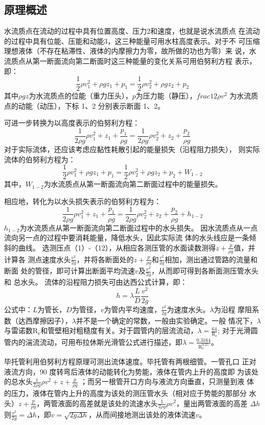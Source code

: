\documentclass[dvipsnames, svgnames,a4paper,11pt]{article}
\begin{document}
\subsection{原理概述}
水流质点在流动的过程中具有位置高度、压力2和速度，也就是说水流质点
在流动的过程中具有位能、压能和动能3，这三种能量可用水柱高度表示。对于不
可压缩理想液体（不存在粘滞性、液体的内摩擦力为零，故所做的功也为零）来
说，水流质点从第一断面流向第二断面时这三种能量的变化关系可用伯努利方程
表示，即：
$$\frac{1}{2}\rho v_1^2+\rho gz_1+p_1=\frac{1}{2}\rho v_2^2+\rho gz_2+p_2$$
其中$\rho gz$为水流质点的位能（重力压头），$p$为压力能（静压），$frac{1}{2}\rho v^2$
为水流质点的动能（动压），下标 1、2 分别表示断面 1、2。

可进一步转换为以高度表示的伯努利方程：
$$\frac{1}{2\rho g}\rho v_1^2+z_1+\frac{p_1}{\rho g}=\frac{1}{2\rho g}\rho v_2^2+z_2+\frac{p_2}{\rho g}$$
对于实际流体，还应该考虑应黏性耗散引起的能量损失（沿程阻力损失），
则实际流体的伯努利方程为：
$$\frac{1}{2}\rho v_1^2+\rho gz_1+p_1=\frac{1}{2}\rho v_2^2+\rho gz_2+p_2+W_{1-2}$$
其中，$W_{1-2}$为水流质点从第一断面流向第二断面过程中的能量损失。

相应地，转化为以水头损失表示的伯努利方程为：
$$\frac{1}{2\rho g}\rho v_1^2+z_1+\frac{p_1}{\rho g}=\frac{1}{2\rho g}\rho v_2^2+z_2+\frac{p_2}{\rho g}+h_{1-2}$$
$h_{1-2}$为水流质点从第一断面流向第二断面过程中的水头损失。
因水流质点从一点流向另一点的过程中要消耗能量，降低水头，因此实际流
体的水头线应是一条倾斜的曲线。
选测压点（1）-（12），从相应各测压管的水面读数测得$z+\frac{p}{\rho g}$值，并计算各
测点速度水头$\frac{ v^2}{2g}$，并将各断面处的$z+\frac{p}{\rho g}$和$\frac{ v^2}{2g}$相加，测出通过管路的流量和断面
处的管径，即可计算出断面平均流速$v$及$\frac{v^2}{2g}$，从而即可得到各断面测压管水头和
总水头。
流体的沿程阻力损失可由达西公式计算，即：
$$h=\lambda\frac{L}{D}\frac{v^2}{2g}$$
公式中：$L$为管长，$D$为管径，$v$为管内平均速度，$\frac{v^2}{2g}$为速度水头。$\lambda$为沿程
摩阻系数（达西摩擦因子），$\lambda$并不是一个确定的常数，一般由实验确定。一般
情况下，$\lambda$与雷诺数$\text{R}_\text{e}$和管壁相对粗糙度有关。对于圆管内的层流流动，$\lambda=\frac{64}{\text{R}_\text{e}}$;
对于光滑圆管内的湍流流动，可用布拉休斯光滑管公式进行描述，即$\lambda=\frac{0.3164}{\text{R}_\text{e}^{0.25}}$。

毕托管利用伯努利方程原理可测出流体速度。毕托管有两根细管。一管孔口
正对液流方向，90 度转弯后液体的动能转化为势能，液体在管内上升的高度即
为该处的总水头$\frac{1}{2\rho g}\rho v^2+z+\frac{p}{\rho g}$
；而另一根管开口方向与液流方向垂直，只测量到液
体的压力，液体在管内上升的高度为该处的测压管水头（相对应于势能的那部分
水头）$z+\frac{p}{\rho g}$，两管液面的高差就是该处的流速水头$\frac{1}{2\rho g}\rho v^2$，量出两管液面的高差
$\Delta h$则$\frac{v^2}{2g}=\Delta h$，即$v=\sqrt{2g\Delta h}$，从而间接地测出该处的液体流速$v$。
\end{document}
